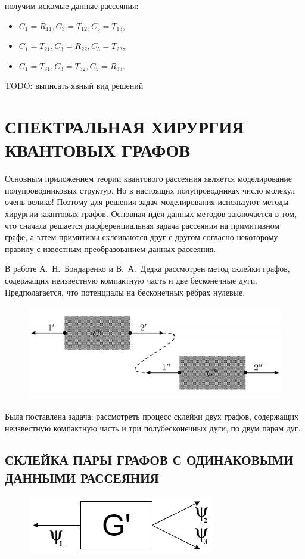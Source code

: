 \documentclass[a4 paper, 12 pt]{extarticle}
\begin{document}
   получим искомые данные рассеяния:
   \begin{itemize}
  	 \item $C_1 = R_{11}, C_3 = T_{12}, C_5 = T_{13}$, 
  	 \item $C_1 = T_{21}, C_3 = R_{22}, C_5 = T_{23}$,  
 	 \item $C_1 = T_{31}, C_3 = T_{32}, C_5 = R_{33}$.
   \end{itemize}

   TODO: выписать явный вид решений
   
   \pagebreak
   
   \section{СПЕКТРАЛЬНАЯ ХИРУРГИЯ КВАНТОВЫХ ГРАФОВ}
   Основным приложением теории квантового рассеяния является моделирование полупроводниковых структур. Но в настоящих полупроводниках число молекул очень велико! Поэтому для решения задач моделирования используют методы хирургии квантовых графов. Основная идея данных методов заключается в том, что сначала решается дифференциальная задача рассеяния на примитивном графе, а затем примитивы склеиваются друг с другом согласно некоторому правилу с известным преобразованием данных рассеяния.
   
   В работе А.~Н.~Бондаренко и В.~А.~Дедка \cite{SpectralSurgery} рассмотрен метод склейки графов, содержащих неизвестную компактную часть и две бесконечные дуги. Предполагается, что потенциалы на бесконечных рёбрах нулевые.
   \begin{figure}[!htb]
   	\centering
   	\includegraphics[scale=0.3]{skleika1.png}
   \end{figure}

   Была поставлена задача: рассмотреть процесс склейки двух графов, содержащих неизвестную компактную часть и три полубесконечных дуги, по двум парам дуг.
   
   \subsection{СКЛЕЙКА ПАРЫ ГРАФОВ С ОДИНАКОВЫМИ ДАННЫМИ РАССЕЯНИЯ}
   \begin{figure}[!htb]
   	\centering
   	\includegraphics[scale=0.5]{g_prime.png}
   \end{figure}
\end{document}
